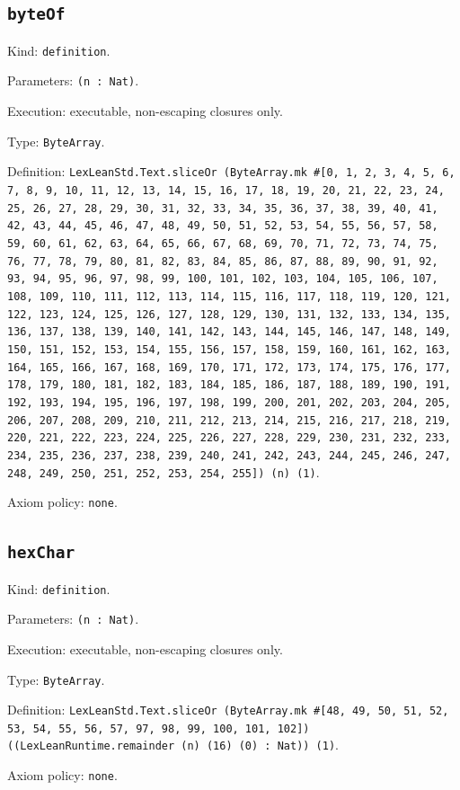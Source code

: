 \documentclass[11pt]{article}
\begin{document}
\subsection*{\texttt{byteOf}}
\noindent Kind: \texttt{definition}.\par
\noindent Parameters: \texttt{(n : Nat)}.\par
\noindent Execution: executable, non-escaping closures only.\par
\noindent Type: \texttt{ByteArray}.\par
\noindent Definition: \texttt{LexLeanStd.Text.sliceOr (ByteArray.mk \#[0, 1, 2, 3, 4, 5, 6, 7, 8, 9, 10, 11, 12, 13, 14, 15, 16, 17, 18, 19, 20, 21, 22, 23, 24, 25, 26, 27, 28, 29, 30, 31, 32, 33, 34, 35, 36, 37, 38, 39, 40, 41, 42, 43, 44, 45, 46, 47, 48, 49, 50, 51, 52, 53, 54, 55, 56, 57, 58, 59, 60, 61, 62, 63, 64, 65, 66, 67, 68, 69, 70, 71, 72, 73, 74, 75, 76, 77, 78, 79, 80, 81, 82, 83, 84, 85, 86, 87, 88, 89, 90, 91, 92, 93, 94, 95, 96, 97, 98, 99, 100, 101, 102, 103, 104, 105, 106, 107, 108, 109, 110, 111, 112, 113, 114, 115, 116, 117, 118, 119, 120, 121, 122, 123, 124, 125, 126, 127, 128, 129, 130, 131, 132, 133, 134, 135, 136, 137, 138, 139, 140, 141, 142, 143, 144, 145, 146, 147, 148, 149, 150, 151, 152, 153, 154, 155, 156, 157, 158, 159, 160, 161, 162, 163, 164, 165, 166, 167, 168, 169, 170, 171, 172, 173, 174, 175, 176, 177, 178, 179, 180, 181, 182, 183, 184, 185, 186, 187, 188, 189, 190, 191, 192, 193, 194, 195, 196, 197, 198, 199, 200, 201, 202, 203, 204, 205, 206, 207, 208, 209, 210, 211, 212, 213, 214, 215, 216, 217, 218, 219, 220, 221, 222, 223, 224, 225, 226, 227, 228, 229, 230, 231, 232, 233, 234, 235, 236, 237, 238, 239, 240, 241, 242, 243, 244, 245, 246, 247, 248, 249, 250, 251, 252, 253, 254, 255]) (n) (1)}.\par
\noindent Axiom policy: \texttt{none}.\par
\subsection*{\texttt{hexChar}}
\noindent Kind: \texttt{definition}.\par
\noindent Parameters: \texttt{(n : Nat)}.\par
\noindent Execution: executable, non-escaping closures only.\par
\noindent Type: \texttt{ByteArray}.\par
\noindent Definition: \texttt{LexLeanStd.Text.sliceOr (ByteArray.mk \#[48, 49, 50, 51, 52, 53, 54, 55, 56, 57, 97, 98, 99, 100, 101, 102]) ((LexLeanRuntime.remainder (n) (16) (0) : Nat)) (1)}.\par
\noindent Axiom policy: \texttt{none}.\par
\end{document}
